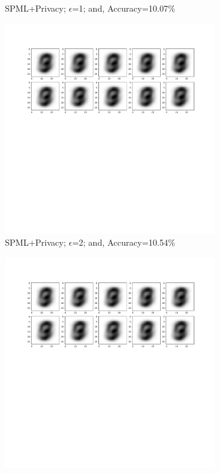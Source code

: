 \begin{figure}
\begin{subfigure}{.325\textwidth}
         \vspace{-8em}
         \caption{SPML+Privacy; $\epsilon$=1; and, Accuracy=10.07\%}
         \label{default}
     \end{subfigure}
     \begin{subfigure}{.325\textwidth}
         \includegraphics[width=\textwidth]{images/Sim_attack/Mnistattack2.pdf}
         \vspace{-8em}
         \caption{SPML+Privacy; $\epsilon$=2; and, Accuracy=10.54\%}
         \label{default}
     \end{subfigure}
     \begin{subfigure}{.325\textwidth}
         \includegraphics[width=\textwidth]{images/Sim_attack/Mnistattack4.pdf}

\end{subfigure}
\end{figure}
